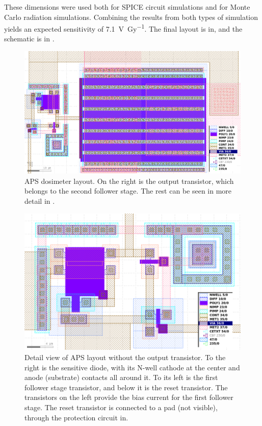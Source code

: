 These dimensions were used both for SPICE circuit simulations and for Monte Carlo radiation simulations.
Combining the results from both types of simulation yields an expected sensitivity of
\SI{7.1}{\volt\per\gray}.
The final layout is in,
and the schematic is in .
\begin{figure}[p]
    \centering
    \includegraphics[width=\columnwidth]{figuras/gds/aps/todo.png}
    \caption{APS dosimeter layout.
    On the right is the output transistor, which belongs to the second follower stage.
    The rest can be seen in more detail in .}
    \label{fig:layoutaps}
\end{figure}
\begin{figure}[p]
    \centering
    \includegraphics[width=\columnwidth]{figuras/gds/aps/zoom.png}
    \caption{Detail view of APS layout without the output transistor.
        To the right is the sensitive diode, with its N-well cathode at the center
        and anode (substrate) contacts all around it.
        To its left is the first follower stage transistor,
        and below it is the reset transistor.
        The transistors on the left provide the bias current for the first follower stage.
        The reset transistor is connected to a pad (not visible),
        through the protection circuit in.}
    \label{fig:layoutapszoom}
\end{figure}

